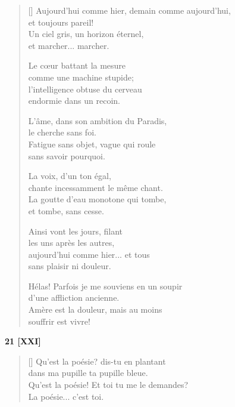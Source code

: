 \documentclass[a4paper,12pt]{book}
\begin{document}
\begin{verse}[\versewidth]
  Aujourd'hui comme hier, demain comme aujourd'hui, \\
  et toujours pareil! \\
  Un ciel gris, un horizon éternel, \\
  et marcher... marcher.

  Le cœur battant la mesure \\
  comme une machine stupide; \\
  l'intelligence obtuse du cerveau \\
  endormie dans un recoin.

  L'âme, dans son ambition du Paradis, \\
  le cherche sans foi. \\
  Fatigue sans objet, vague qui roule \\
  sans savoir pourquoi.

  La voix, d'un ton égal, \\
  chante incessamment le même chant. \\
  La goutte d'eau monotone qui tombe, \\
  et tombe, sans cesse.

  Ainsi vont les jours, filant \\
  les uns après les autres, \\
  aujourd'hui comme hier... et tous \\
  sans plaisir ni douleur.

  Hélas! Parfois je me souviens en un soupir \\
  d'une affliction ancienne. \\
  Amère est la douleur, mais au moins \\
  souffrir est vivre!
\end{verse}

\bigskip

\begin{center}
  \textbf{21 [XXI]}
\end{center}

\settowidth{\versewidth}{Qu'est la poésie! Et toi tu me le demandes?}

\begin{verse}[\versewidth]
  Qu'est la poésie? dis-tu en plantant \\
  dans ma pupille ta pupille bleue. \\
  Qu'est la poésie! Et toi tu me le demandes? \\
  La poésie... c'est toi.
\end{verse}
\end{document}
